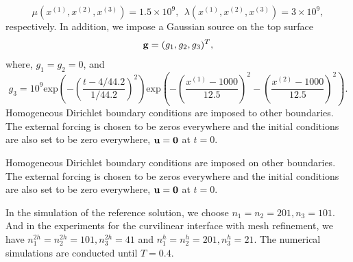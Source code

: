 \begin{equation}
\mu(x^{(1)},x^{(2)},x^{(3)}) = 1.5\times 10^9,\ \ 
\lambda(x^{(1)},x^{(2)},x^{(3)})  = 3\times 10^9,
\end{equation}
respectively. In addition, we impose a Gaussian source on the top surface
\[{\bf g} = (g_1,g_2,g_3)^T ,\]
where, $g_1 = g_2 = 0$, and 
\[g_3 = 10^9 \text{exp}\left(-\left(\frac{t-4/44.2}{1/44.2}\right)^2\right)\text{exp}\left(-\left(\frac{x^{(1)}-1000}{12.5}\right)^2-\left(\frac{x^{(2)}-1000}{12.5}\right)^2\right).\]
Homogeneous Dirichlet boundary conditions are imposed to other boundaries. The external forcing is chosen to be zeros everywhere and the initial conditions are also set to be zero everywhere, ${\bf u} = {\bf 0}$ at $t = 0$.

Homogeneous Dirichlet boundary conditions are imposed on other boundaries. The external forcing is chosen to be zeros everywhere and the initial conditions are also set to be zero everywhere, ${\bf u} = {\bf 0}$ at $t = 0$.

In the simulation of the reference solution, we choose $n_1 = n_2 = 201, n_3 = 101$. And in the experiments for the curvilinear interface with mesh refinement, we have $n_1^{2h} = n_2^{2h} = 101, n_3^{2h} = 41$ and $n_1^h = n_2^h = 201, n_3^h = 21$. The numerical simulations are conducted until $T = 0.4$.

